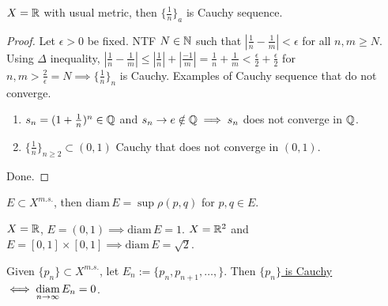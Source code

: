 \documentclass[]{article}
\begin{document}
\begin{example}
	$X = \mathbb{R}$ with usual metric, then $\{\frac{1}{n}\}_a$ is Cauchy sequence.
\end{example}
\begin{proof}
	Let $\epsilon > 0$ be fixed. NTF $N\in\mathbb{N}$ such that $\left|\frac{1}{n}-\frac{1}{m}\right| < \epsilon$ for all $n,m\geq N$.
	Using $\Delta$ inequality, $|\frac{1}{n}-\frac{1}{m}| \leq |\frac{1}{n}| + |\frac{-1}{m}| = \frac{1}{n} + \frac{1}{m} < \frac{\epsilon}{2} + \frac{\epsilon}{2}$ for $n,m>\frac{2}{\epsilon} = N \implies \{\frac{1}{n}\}_n$ is Cauchy.
	Examples of Cauchy sequence that do not converge.
	\begin{enumerate}
		\item $s_n = (1+\frac{1}{n})^n\in\mathbb{Q}$ and $s_n\rightarrow e\notin\mathbb{Q} \implies s_n$ does not converge in $\mathbb{Q}$.
		\item $\{\frac{1}{n}\}_{n\geq 2}\subset(0,1)$ Cauchy that does not converge in $(0,1)$.
	\end{enumerate}
	Done.
\end{proof}
\begin{definition}
	$E\subset X^{m.s.}$, then $\text{diam}\, E = \sup\rho(p,q)$ for $p,q\in E$.
\end{definition}
\begin{example}
	$X = \mathbb{R}$, $E = (0,1) \implies \text{diam}\, E = 1$. $X = \mathbb{R}^2$ and $E = [0,1]\times [0,1] \implies \text{diam}\, E = \sqrt{2}$.
\end{example}

Given $\{p_n\}\subset X^{m.s.}$, let $E_n := \{p_n,p_{n+1},\dots,\}$. Then \ul{$\{p_n\}$ is Cauchy $\iff \underset{n\rightarrow\infty}{\text{diam}}\, E_n = 0$}.
\end{document}
